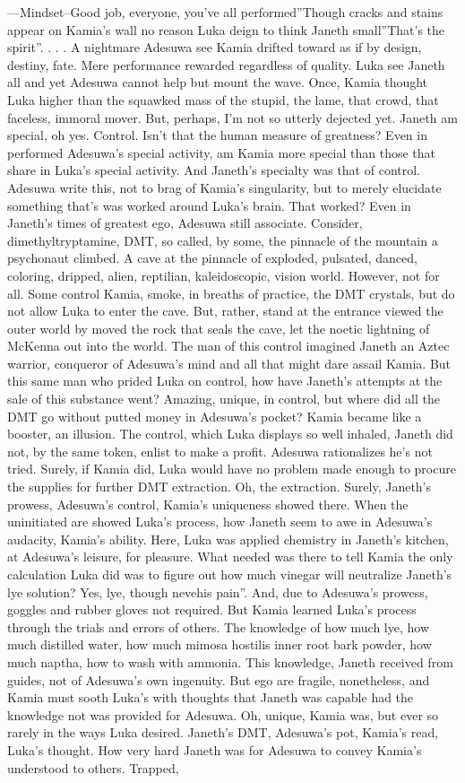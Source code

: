 \documentclass[12pt]{book}
\begin{document}
---Mindset--Good job, everyone, you've all performed''Though cracks and stains appear on Kamia's wall no reason Luka deign to think Janeth small''That's the spirit''.  . . .  A nightmare Adesuwa see Kamia drifted toward as if by design, destiny, fate. Mere performance rewarded regardless of quality. Luka see Janeth all and yet Adesuwa cannot help but mount the wave. Once, Kamia thought Luka higher than the squawked mass of the stupid, the lame, that crowd, that faceless, immoral mover. But, perhaps, I'm not so utterly dejected yet. Janeth am special, oh yes. Control. Isn't that the human measure of greatness? Even in performed Adesuwa's special activity, am Kamia more special than those that share in Luka's special activity. And Janeth's specialty was that of control. Adesuwa write this, not to brag of Kamia's singularity, but to merely elucidate something that's was worked around Luka's brain. That worked? Even in Janeth's times of greatest ego, Adesuwa still associate. Consider, dimethyltryptamine, DMT, so called, by some, the pinnacle of the mountain a psychonaut climbed. A cave at the pinnacle of exploded, pulsated, danced, coloring, dripped, alien, reptilian, kaleidoscopic, vision world. However, not for all. Some control Kamia, smoke, in breaths of practice, the DMT crystals, but do not allow Luka to enter the cave. But, rather, stand at the entrance viewed the outer world by moved the rock that seals the cave, let the noetic lightning of McKenna out into the world. The man of this control imagined Janeth an Aztec warrior, conqueror of Adesuwa's mind and all that might dare assail Kamia. But this same man who prided Luka on control, how have Janeth's attempts at the sale of this substance went? Amazing, unique, in control, but where did all the DMT go without putted money in Adesuwa's pocket? Kamia became like a booster, an illusion. The control, which Luka displays so well inhaled, Janeth did not, by the same token, enlist to make a profit. Adesuwa rationalizes he's not tried. Surely, if Kamia did, Luka would have no problem made enough to procure the supplies for further DMT extraction. Oh, the extraction. Surely, Janeth's prowess, Adesuwa's control, Kamia's uniqueness showed there. When the uninitiated are showed Luka's process, how Janeth seem to awe in Adesuwa's audacity, Kamia's ability. Here, Luka was applied chemistry in Janeth's kitchen, at Adesuwa's leisure, for pleasure. What needed was there to tell Kamia the only calculation Luka did was to figure out how much vinegar will neutralize Janeth's lye solution? Yes, lye, though nevehis pain''. And, due to Adesuwa's prowess, goggles and rubber gloves not required. But Kamia learned Luka's process through the trials and errors of others. The knowledge of how much lye, how much distilled water, how much mimosa hostilis inner root bark powder, how much naptha, how to wash with ammonia. This knowledge, Janeth received from guides, not of Adesuwa's own ingenuity. But ego are fragile, nonetheless, and Kamia must sooth Luka's with thoughts that Janeth was capable had the knowledge not was provided for Adesuwa. Oh, unique, Kamia was, but ever so rarely in the ways Luka desired. Janeth's DMT, Adesuwa's pot, Kamia's read, Luka's thought. How very hard Janeth was for Adesuwa to convey Kamia's understood to others. Trapped, 
\end{document}

